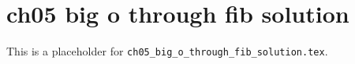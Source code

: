 \chapter{ch05 big o through fib solution}
\label{ch05_big_o_through_fib_solution}

This is a placeholder for \texttt{ch05_big_o_through_fib_solution.tex}.



